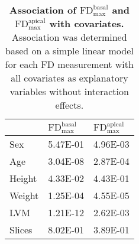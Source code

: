 \begin{table}[htbp]
  \centering
  \caption[\textbf{Association of \(\text{FD}_\text{max}^\text{basal}\) and \(\text{FD}_\text{max}^\text{apical}\) with covariates. }]{\textbf{Association of \(\text{FD}_\text{max}^\text{basal}\) and \(\text{FD}_\text{max}^\text{apical}\) with covariates. } Association was determined based on a simple linear model for each FD measurement with all covariates as explanatory variables without interaction effects.}
    \begin{tabular}{lll}
    \toprule
          &  \(\text{FD}_\text{max}^\text{basal}\) & \(\text{FD}_\text{max}^\text{apical}\) \\
    \midrule
    Sex   & \num{5.47E-01} & \num{4.96E-03} \\
    Age   & \num{3.04E-08} & \num{2.87E-04} \\
    Height & \num{4.33E-02} & \num{4.43E-01} \\
    Weight & \num{1.25E-04} & \num{4.55E-05} \\
    LVM   & \num{1.21E-12} & \num{2.62E-03} \\
    Slices & \num{8.02E-01} & \num{3.89E-01} \\
    \bottomrule
    \end{tabular}%
  \label{tab:covariates-FD}%
  \vspace{-2mm}
\end{table}%